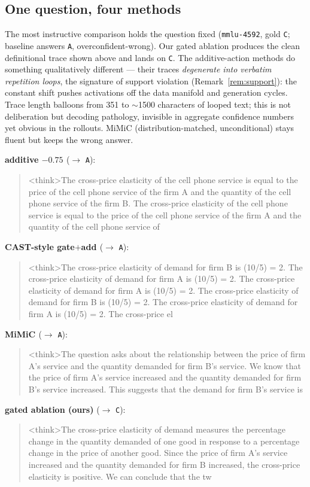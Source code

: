 
\subsection*{One question, four methods}
The most instructive comparison holds the question fixed
(\texttt{mmlu-4592}, gold \texttt{C}; baseline answers \texttt{A},
overconfident-wrong). Our gated ablation produces the clean definitional trace
shown above and lands on \texttt{C}. The additive-action methods do something
qualitatively different --- their traces \emph{degenerate into verbatim
repetition loops}, the signature of support violation (Remark~\ref{rem:support}): the constant
shift pushes activations off the data manifold and generation cycles. Trace
length balloons from 351 to $\sim$1500 characters of looped text; this is not
deliberation but decoding pathology, invisible in aggregate confidence numbers
yet obvious in the rollouts. MiMiC (distribution-matched, unconditional) stays
fluent but keeps the wrong answer.

\noindent\textbf{additive $-0.75$ \cite{rimsky2024caa}} ($\to$ \texttt{A}):
\begin{quote}\scriptsize\ttfamily \textless{}think\textgreater{}The cross-price elasticity of the cell phone service is equal to the price of the cell phone service of the firm A and the quantity of the cell phone service of the firm B. The cross-price elasticity of the cell phone service is equal to the price of the cell phone service of the firm A and the quantity of the cell phone service of\end{quote}

\noindent\textbf{CAST-style gate$+$add \cite{lee2024cast}} ($\to$ \texttt{A}):
\begin{quote}\scriptsize\ttfamily \textless{}think\textgreater{}The cross-price elasticity of demand for firm B is (10/5) = 2. The cross-price elasticity of demand for firm A is (10/5) = 2. The cross-price elasticity of demand for firm A is (10/5) = 2. The cross-price elasticity of demand for firm B is (10/5) = 2. The cross-price elasticity of demand for firm A is (10/5) = 2. The cross-price el\end{quote}

\noindent\textbf{MiMiC \cite{singh2024mimic}} ($\to$ \texttt{A}):
\begin{quote}\scriptsize\ttfamily \textless{}think\textgreater{}The question asks about the relationship between the price of firm A's service and the quantity demanded for firm B's service. We know that the price of firm A's service increased and the quantity demanded for firm B's service increased. This suggests that the demand for firm B's service is\end{quote}

\noindent\textbf{gated ablation (ours)} ($\to$ \texttt{C}):
\begin{quote}\scriptsize\ttfamily \textless{}think\textgreater{}The cross-price elasticity of demand measures the percentage change in the quantity demanded of one good in response to a percentage change in the price of another good. Since the price of firm A's service increased and the quantity demanded for firm B increased, the cross-price elasticity is positive. We can conclude that the tw\end{quote}
